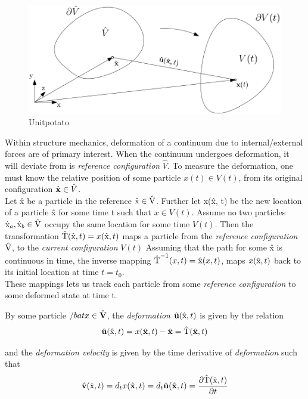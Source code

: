 \begin{figure}[h!]
  \centering
    \includegraphics[scale=0.4]{./Fig/unitpotato.png}
      \caption{Unitpotato}
\end{figure}

Within structure mechanics, deformation of a continuum due to internal/external forces are of primary interest. When the continuum undergoes deformation, it will deviate from is \textit{reference configuration} $\hat{V}$. To measure the deformation, one must know the relative position of some particle $x(t) \in V(t)$, from its original configuration $\hat{\mathbf{x}} \in \hat{V}$. \\

 Let \^{x} be a particle in the reference  $\text{\^{x}} \in \text{\^{V}}$.  Further let x(\^x, t) be the new location of a particle \^x for some time t such that $x \in V(t)$. Assume no two particles $\text{\^{x}}_a, \text{\^{x}}_b \in \text{\^{V}}$ occupy the same location for some time $V(t)$.
Then the transformation $\text{\^{T}}(\text{\^{x}}, t) = x(\text{\^{x}}, t)$ maps a particle  from the \textit{reference configuration} $\text{\^{V}}$, to the  \textit{current configuration} $V(t)$
Assuming that the path for some \^{x} is continuous in time, the inverse mapping $\text{\^{T}}^{-1}(x, t) = \text{\^{x}}(x, t)$, maps $x(\text{\^{x}}, t)$ back to its initial location at time $t = t_0$. \\
These mappings lets us track each particle from some \textit{reference configuration} to some deformed state at time t. 


By some particle $/bat{x} \in \hat{\mathbf{V}}$, the \textit{deformation} $\hat{\mathbf{u}}(\text{\^{x}},t)$ is given by the relation
\begin{align}
\hat{\mathbf{u}}(\text{\^{x}},t) = x(\hat{\mathbf{x}},t) - \hat{\mathbf{x}} = \text{\^{T}}(\hat{\mathbf{x}}, t) 
\end{align}

and the \textit{deformation velocity} is given by the time derivative of \textit{deformation} such that
\begin{align}
\hat{\mathbf{v}}(\text{\^{x}},t) = d_t x(\hat{\mathbf{x}},t) = d_t \hat{\mathbf{u}}(\hat{\mathbf{x}},t) = \frac{\partial \text{\^{T}}(\text{\^{x}}, t)}{\partial t} 
\end{align}

